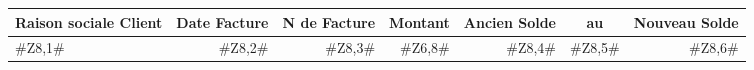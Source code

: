        \vspace{30mm}        

        \begin{flushright}     
       \begin{tabular}{|p{3.5cm}|p{1.3cm}|p{1.3cm}|p{1.3cm}|p{1.5cm}|p{1.5cm}|p{1.5cm}|}
        \hline
       \multicolumn{1}{|c|}{\textbf{\small{Raison sociale Client}}} & 
       \multicolumn{1}{c|}{\textbf{\small{Date Facture}}} &
       \multicolumn{1}{c|}{\textbf{\small{N de Facture}}} & 
       \multicolumn{1}{c|}{\textbf{\small{Montant}}} & 
       \multicolumn{1}{c|}{\textbf{\small{Ancien Solde}}}& 
       \multicolumn{1}{c|}{\textbf{\small{au}}} & 
       \multicolumn{1}{c|}{\textbf{\small{Nouveau Solde}}}  \\       \hline
       \multicolumn{1}{|l|}{#Z8,1#}             & 
       \multicolumn{1}{r|}{#Z8,2#}             & 
       \multicolumn{1}{r|}{#Z8,3#}             & 
       \multicolumn{1}{r|}{#Z6,8#}              & 
       \multicolumn{1}{r|}{#Z8,4#}              & 
       \multicolumn{1}{r|}{#Z8,5#}  	   & 
       \multicolumn{1}{r|}{#Z8,6#} \\ 	   
       \hline
       \end{tabular}
       \hspace{1cm} \null
       \end{flushright}  



